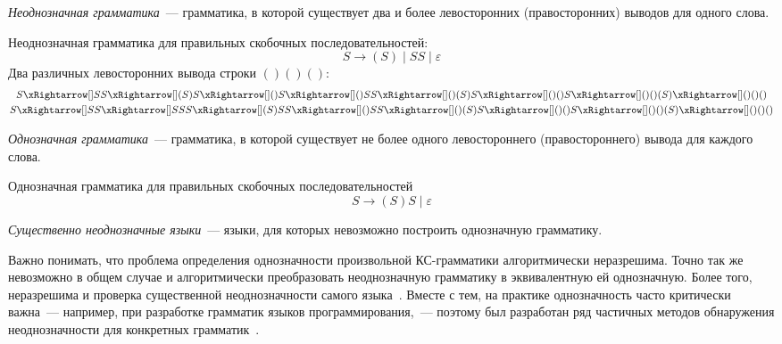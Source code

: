 \begin{definition}
    \emph{Неоднозначная грамматика}~--- грамматика, в которой существует два и более левосторонних (правосторонних) выводов для одного слова.
\end{definition}

\begin{example}
    Неоднозначная грамматика для правильных скобочных последовательностей:
    \[
        S \to (S) \mid S S \mid \varepsilon
    \]
    Два различных левосторонних вывода строки $()()()$:
    \begin{gather*}
        S \derives[] S S \derives [] (S) S \derives[] () S \derives[] () S S \derives[] () (S) S \derives[] () () S \derives[] () () (S) \derives[] () () ()\\
        S \derives[] S S \derives[] S S S \derives[] (S) S S \derives[] () S S \derives[] () (S) S \derives[] () () S \derives[] () () (S) \derives[] () () ()
    \end{gather*}
\end{example}

\begin{definition}
    \emph{Однозначная грамматика}~--- грамматика, в которой существует не более одного левостороннего (правостороннего) вывода для каждого слова.
\end{definition}

\begin{example}
    Однозначная грамматика для правильных скобочных последовательностей
    \[
        S \to (S)S \mid \varepsilon
    \]
\end{example}

\begin{definition}
    \emph{Существенно неоднозначные языки}~--- языки, для которых невозможно построить однозначную грамматику.
\end{definition}

Важно понимать, что проблема определения однозначности произвольной КС-грамматики алгоритмически неразрешима.
Точно так же невозможно в общем случае и алгоритмически преобразовать неоднозначную грамматику в эквивалентную ей однозначную.
Более того, неразрешима и проверка существенной неоднозначности самого языка~.
Вместе с тем, на практике однозначность часто критически важна~--- например, при разработке грамматик языков программирования,~--- поэтому был разработан ряд частичных методов обнаружения неоднозначности для конкретных грамматик~.

